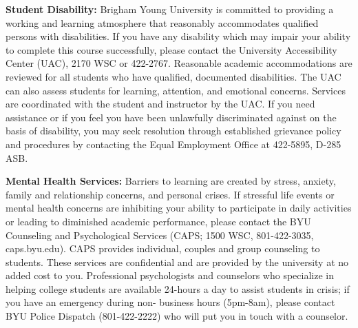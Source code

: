 \documentclass[12pt]{article}
\begin{document}
\vspace{.5 cm}


\textbf {\large Student Disability:} 
Brigham Young University is committed to providing a working and learning atmosphere that reasonably accommodates qualified persons with disabilities. If you have any disability which may impair your ability to complete this course successfully, please contact the University Accessibility Center (UAC), 2170 WSC or 422-2767. Reasonable academic accommodations are reviewed for all students who have qualified, documented disabilities. The UAC can also assess students for learning, attention, and emotional concerns. Services are coordinated with the student and instructor by the UAC. If you need assistance or if you feel you have been unlawfully discriminated against on the basis of disability, you may seek resolution through established grievance policy and procedures by contacting the Equal Employment Office at 422-5895, D-285 ASB.

\vspace{.5 cm}


\textbf {\large Mental Health Services:} 
Barriers to learning are created by stress, anxiety, family and relationship concerns, and personal crises. If stressful life events or mental health concerns are inhibiting your ability to participate in daily activities or leading to diminished academic performance, please contact the BYU Counseling and Psychological Services (CAPS; 1500 WSC, 801-422-3035, caps.byu.edu). CAPS provides individual, couples and group counseling to students. These services are confidential and are provided by the university at no added cost to you. Professional psychologists and counselors who specialize in helping college students are available 24-hours a day to assist students in crisis; if you have an emergency during non- business hours (5pm-8am), please contact BYU Police Dispatch (801-422-2222) who will put you in touch with a counselor.
\end{document}
